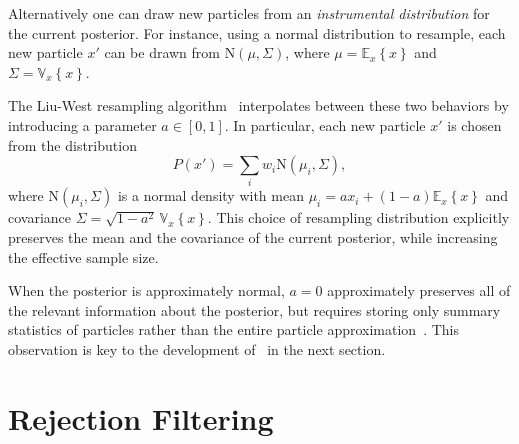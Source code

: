 \documentclass[twoside]{article}
\newcommand{\expect}[2]{{\mathbb{E}_{#2}}\!\left\{#1 \right\}}
\newcommand{\var}[2]{{\mathbb{V}_{#2}}\!\left\{#1 \right\}}
\newcommand{\CRej}{\text{rejection filtering}}
\newcommand{\NN}{\mathrm{N}}
\begin{document}
Alternatively one can draw new particles from an \emph{instrumental distribution} for
the current posterior. For instance, using a normal distribution to resample,
each new particle $x'$ can be drawn from $\NN(\mu, \Sigma)$, where
$\mu = \expect{x}{x}$ and $\Sigma = \var{x}{x}$.

The Liu-West resampling algorithm~\cite{liu2001combined} interpolates between these two
behaviors by introducing a parameter $a \in [0, 1]$. In particular, each new particle
$x'$ is chosen from the distribution
\begin{equation}
  \label{eq:liu-west}
  P(x') = \sum_i w_i \NN(\mu_i, \Sigma),
\end{equation}
where $\NN(\mu_i, \Sigma)$ is a normal density with mean
$\mu_i = a x_i + (1 - a) \expect xx$
and covariance $\Sigma = \sqrt{1 - a^2}\,\var{x}{x}$.
This choice of resampling distribution explicitly preserves the mean
and the covariance of the current posterior, while increasing the
effective sample size.

When the posterior is approximately normal, $a = 0$ approximately
preserves all of the relevant information about the posterior, but requires
storing only summary statistics of particles rather than the entire particle
approximation~\cite{del2012adaptive,sisson_sequential_2007}.   This observation is key to
the development of \CRej~in the next section.



\section{Rejection Filtering}\label{sec:method}



\end{document}
